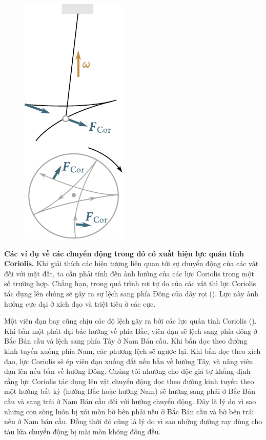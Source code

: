 \begin{figure}[!htb]
\begin{minipage}[t]{0.34\linewidth}
\begin{center}
			\caption[]{}
			\label{fig:4_10}
		\end{center}
	\end{minipage}
	\hspace{-0.2cm}
	\begin{minipage}[t]{0.3\linewidth}
		\begin{center}
			\includegraphics[scale=0.84]{figures/ch_04/fig_4_11.pdf}
			\caption[]{}
			\label{fig:4_11}
		\end{center}
	\end{minipage}
\end{figure}

\textbf{Các ví dụ về các chuyển động trong đó có xuất hiện lực quán tính Coriolis.} Khi giải thích các hiện tượng liên quan tới sự chuyển động của các vật đối với mặt đất, ta cần phải tính đến ảnh hưởng của các lực Coriolis trong một số trường hợp. Chẳng hạn, trong quá trình rơi tự do của các vật thì lực Coriolis tác dụng lên chúng sẽ gây ra sự lệch sang phía Đông của dây rọi (). Lực này ảnh hưởng cực đại ở xích đạo và triệt tiêu ở các cực.

Một viên đạn bay cũng chịu các độ lệch gây ra bởi các lực quán tính Coriolis (). Khi bắn một phát đại bác hướng về phía Bắc, viên đạn sẽ lệch sang phía đông ở Bắc Bán cầu và lệch sang phía Tây ở Nam Bán cầu. Khi bắn dọc theo đường kinh tuyến xuống phía Nam, các phương lệch sẽ ngược lại. Khi bắn dọc theo xích đạo, lực Coriolis sẽ ép viên đạn xuống đất nếu bắn về hướng Tây, và nâng viên đạn lên nếu bắn về hướng Đông. Chúng tôi nhường cho độc giả tự khẳng định rằng lực Coriolis tác dụng lên vật chuyển động dọc theo đường kinh tuyến theo một hướng bất kỳ (hướng Bắc hoặc hướng Nam) sẽ hướng sang phải ở Bắc Bán cầu và sang trái ở Nam Bán cầu đối với hướng chuyển động. Đây là lý do vì sao những con sông luôn bị xói mòn bờ bên phải nếu ở Bắc Bán cầu và bờ bên trái nếu ở Nam bán cầu. Đồng thời đó cũng là lý do vì sao những đường ray dùng cho tàu lửa chuyển động bị mài mòn không đồng đều.

